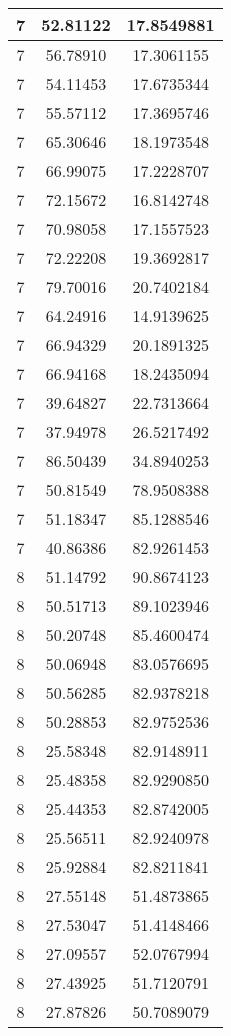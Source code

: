 \documentclass[
]{book}
\begin{document}
\begin{tabular}{c|c|c}
\hline
7 & 52.81122 & 17.8549881\\
\hline
7 & 56.78910 & 17.3061155\\
\hline
7 & 54.11453 & 17.6735344\\
\hline
7 & 55.57112 & 17.3695746\\
\hline
7 & 65.30646 & 18.1973548\\
\hline
7 & 66.99075 & 17.2228707\\
\hline
7 & 72.15672 & 16.8142748\\
\hline
7 & 70.98058 & 17.1557523\\
\hline
7 & 72.22208 & 19.3692817\\
\hline
7 & 79.70016 & 20.7402184\\
\hline
7 & 64.24916 & 14.9139625\\
\hline
7 & 66.94329 & 20.1891325\\
\hline
7 & 66.94168 & 18.2435094\\
\hline
7 & 39.64827 & 22.7313664\\
\hline
7 & 37.94978 & 26.5217492\\
\hline
7 & 86.50439 & 34.8940253\\
\hline
7 & 50.81549 & 78.9508388\\
\hline
7 & 51.18347 & 85.1288546\\
\hline
7 & 40.86386 & 82.9261453\\
\hline
8 & 51.14792 & 90.8674123\\
\hline
8 & 50.51713 & 89.1023946\\
\hline
8 & 50.20748 & 85.4600474\\
\hline
8 & 50.06948 & 83.0576695\\
\hline
8 & 50.56285 & 82.9378218\\
\hline
8 & 50.28853 & 82.9752536\\
\hline
8 & 25.58348 & 82.9148911\\
\hline
8 & 25.48358 & 82.9290850\\
\hline
8 & 25.44353 & 82.8742005\\
\hline
8 & 25.56511 & 82.9240978\\
\hline
8 & 25.92884 & 82.8211841\\
\hline
8 & 27.55148 & 51.4873865\\
\hline
8 & 27.53047 & 51.4148466\\
\hline
8 & 27.09557 & 52.0767994\\
\hline
8 & 27.43925 & 51.7120791\\
\hline
8 & 27.87826 & 50.7089079\\

\end{tabular}
\end{document}
